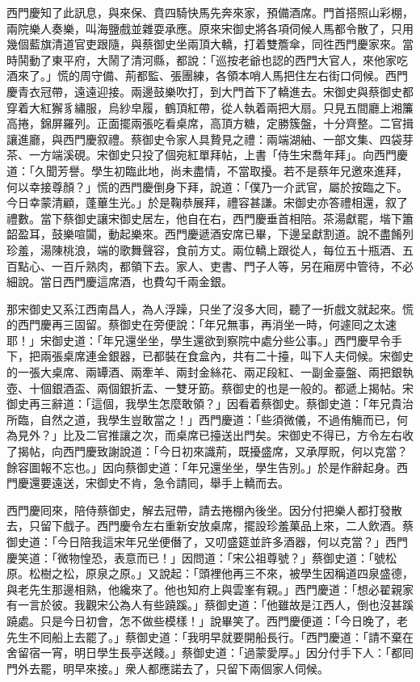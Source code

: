 西門慶知了此訊息，與來保、賁四騎快馬先奔來家，預備酒席。門首搭照山彩棚，兩院樂人奏樂，叫海鹽戲並雜耍承應。原來宋御史將各項伺候人馬都令散了，只用幾個藍旗清道官吏跟隨，與蔡御史坐兩頂大轎，打着雙簷傘，同徃西門慶家來。當時鬨動了東平府，大鬧了清河縣，都說：「巡按老爺也認的西門大官人，來他家吃酒來了。」慌的周守備、荊都監、張團練，各領本哨人馬把住左右街口伺候。西門慶青衣冠帶，遠遠迎接。兩邊鼓樂吹打，到大門首下了轎進去。宋御史與蔡御史都穿着大紅獬豸繡服，烏紗皁履，鶴頂紅帶，從人執着兩把大扇。只見五間廳上湘簾高捲，錦屏羅列。正面擺兩張吃看桌席，高頂方糖，定勝簇盤，十分齊整。二官揖讓進廳，與西門慶叙禮。蔡御史令家人具贄見之禮：兩端湖紬、一部文集、四袋芽茶、一方端溪硯。宋御史只投了個宛紅單拜帖，上書「侍生宋喬年拜」。向西門慶道：「久聞芳譽。學生初臨此地，尚未盡情，不當取擾。若不是蔡年兄邀來進拜，何以幸接尊顏？」慌的西門慶倒身下拜，說道：「僕乃一介武官，屬於按臨之下。今日幸蒙清顧，蓬蓽生光。」於是鞠恭展拜，禮容甚謙。宋御史亦答禮相還，叙了禮數。當下蔡御史讓宋御史居左，他自在右，西門慶垂首相陪。茶湯獻罷，堦下簫韶盈耳，鼓樂喧闐，動起樂來。西門慶遞酒安席已畢，下邊呈獻割道。說不盡餚列珍羞，湯陳桃浪，端的歌舞聲容，食前方丈。兩位轎上跟從人，每位五十瓶酒、五百點心、一百斤熟肉，都領下去。家人、吏書、門子人等，另在廂房中管待，不必細說。當日西門慶這席酒，也費勾千兩金銀。

那宋御史又系江西南昌人，為人浮躁，只坐了沒多大囘，聽了一折戲文就起來。慌的西門慶再三固留。蔡御史在旁便說：「年兄無事，再消坐一時，何遽囘之太速耶！」宋御史道：「年兄還坐坐，學生還欲到察院中處分些公事。」西門慶早令手下，把兩張桌席連金銀器，已都裝在食盒內，共有二十擡，叫下人夫伺候。宋御史的一張大桌席、兩罈酒、兩牽羊、兩封金絲花、兩疋段紅、一副金臺盤、兩把銀執壺、十個銀酒盃、兩個銀折盂、一雙牙筯。蔡御史的也是一般的。都遞上揭帖。宋御史再三辭道：「這個，我學生怎麼敢領？」因看着蔡御史。蔡御史道：「年兄貴治所臨，自然之道，我學生豈敢當之！」西門慶道：「些須微儀，不過侑觴而已，何為見外？」比及二官推讓之次，而桌席已擡送出門矣。宋御史不得已，方令左右收了揭帖，向西門慶致謝說道：「今日初來識荊，既擾盛席，又承厚貺，何以克當？餘容圖報不忘也。」因向蔡御史道：「年兄還坐坐，學生告別。」於是作辭起身。西門慶還要遠送，宋御史不肯，急令請囘，舉手上轎而去。

西門慶囘來，陪侍蔡御史，解去冠帶，請去捲棚內後坐。因分付把樂人都打發散去，只留下戲子。西門慶令左右重新安放桌席，擺設珍羞菓品上來，二人飲酒。蔡御史道：「今日陪我這宋年兄坐便僭了，又叨盛筵並許多酒器，何以克當？」西門慶笑道：「微物惶恐，表意而已！」因問道：「宋公祖尊號？」蔡御史道：「號松原。松樹之松，原泉之原。」又說起：「頭裡他再三不來，被學生因稱道四泉盛德，與老先生那邊相熟，他纔來了。他也知府上與雲峯有親。」西門慶道：「想必翟親家有一言於彼。我觀宋公為人有些蹺蹊。」蔡御史道：「他雖故是江西人，倒也沒甚蹊蹺處。只是今日初會，怎不做些模樣！」說畢笑了。西門慶便道：「今日晚了，老先生不囘船上去罷了。」蔡御史道：「我明早就要開船長行。「西門慶道：「請不棄在舍留宿一宵，明日學生長亭送餞。」蔡御史道：「過蒙愛厚。」因分付手下人：「都囘門外去罷，明早來接。」衆人都應諾去了，只留下兩個家人伺候。

